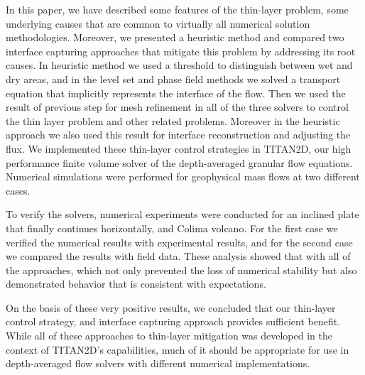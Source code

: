 \documentclass[letterpaper,10pt]{article}
\begin{document}
In this paper, we 
have described some features of the thin-layer problem,
some underlying causes that are common to virtually all numerical 
solution methodologies.  Moreover, we presented a heuristic method and compared 
two interface capturing approaches that 
mitigate this problem by addressing its root causes. In heuristic method we used a threshold to distinguish between wet and dry areas, and in the level set and phase field methods we solved a transport equation that implicitly represents the interface of the flow. Then we used the result of previous step for mesh refinement in all of the three solvers to control the thin layer problem and other related problems. Moreover in the heuristic approach we also used this result for interface reconstruction  and adjusting the flux. 
We implemented these thin-layer control strategies in TITAN2D, our high 
performance finite volume solver of the depth-averaged granular 
flow equations.  Numerical simulations were performed for 
geophysical mass flows at two different cases.

To verify the solvers, numerical experiments were conducted for an inclined plate that finally continues horizontally, and Colima volcano. For the first case we verified the numerical results with experimental results, and for the second case we compared the results with field data. These analysis showed that with all of the approaches,
which not only prevented the loss of numerical stability but also demonstrated behavior that is consistent with expectations.
%
%

On the basis of these very positive results, we concluded that our 
thin-layer control strategy, and interface capturing approach provides sufficient benefit. 
While all of these approaches to thin-layer mitigation was developed in the 
context of TITAN2D's capabilities, much of it should be appropriate 
for use in depth-averaged flow solvers with different numerical 
implementations.
\end{document}
